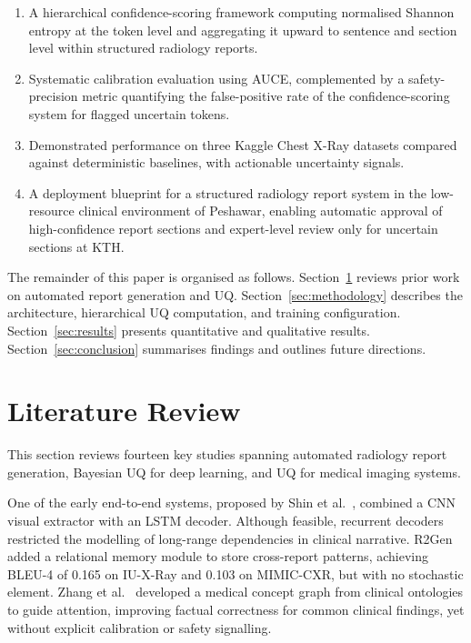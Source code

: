 \documentclass{jcst}
\begin{document}
\begin{enumerate}
  \item A hierarchical confidence-scoring framework computing normalised Shannon entropy at the
        token level and aggregating it upward to sentence and section level within structured radiology reports.
  \item Systematic calibration evaluation using AUCE, complemented by a safety-precision metric
        quantifying the false-positive rate of the confidence-scoring system for flagged uncertain tokens.
  \item Demonstrated performance on three Kaggle Chest X-Ray datasets compared against
        deterministic baselines, with actionable uncertainty signals.
  \item A deployment blueprint for a structured radiology report system in the low-resource
        clinical environment of Peshawar, enabling automatic approval of high-confidence report
        sections and expert-level review only for uncertain sections at KTH.
\end{enumerate}

The remainder of this paper is organised as follows. Section~\ref{sec:litreview} reviews prior work
on automated report generation and UQ. Section~\ref{sec:methodology} describes the architecture,
hierarchical UQ computation, and training configuration. Section~\ref{sec:results} presents
quantitative and qualitative results. Section~\ref{sec:conclusion} summarises findings and
outlines future directions.

\section{Literature Review}
\label{sec:litreview}

This section reviews fourteen key studies spanning automated radiology report generation,
Bayesian UQ for deep learning, and UQ for medical imaging systems.

One of the early end-to-end systems, proposed by Shin et al.~\cite{shin2016}, combined a CNN
visual extractor with an LSTM decoder. Although feasible, recurrent decoders restricted the
modelling of long-range dependencies in clinical narrative. R2Gen~\cite{chen2020} added a
relational memory module to store cross-report patterns, achieving BLEU-4 of 0.165 on
IU-X-Ray and 0.103 on MIMIC-CXR, but with no stochastic element. Zhang et al.~\cite{zhang2020}
developed a medical concept graph from clinical ontologies to guide attention, improving factual
correctness for common clinical findings, yet without explicit calibration or safety signalling.
\end{document}
